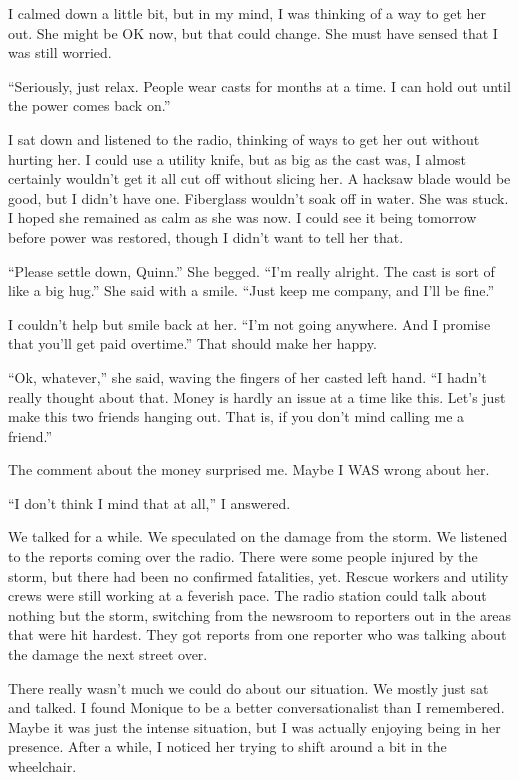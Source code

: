 I calmed down a little bit, but in my mind, I was thinking of a way to get her out. She
might be OK now, but that could change. She must have sensed that I was still worried.

``Seriously, just relax. People wear casts for months at a time. I can hold out until the
power comes back on.'' 

I sat down and listened to the radio, thinking of ways to get her out without hurting her.
I could use a utility knife, but as big as the cast was, I almost certainly wouldn't get it all
cut off without slicing her. A hacksaw blade would be good, but I didn't have one. Fiberglass
wouldn't soak off in water. She was stuck. I hoped she remained as calm as she was now. I could
see it being tomorrow before power was restored, though I didn't want to tell her that.

``Please settle down, Quinn.'' She begged. ``I'm really alright. The cast is sort of like a
big hug.'' She said with a smile. ``Just keep me company, and I'll be fine.''

I couldn't help but smile back at her. ``I'm not going anywhere. And I promise that you'll
get paid overtime.'' That should make her happy.

``Ok, whatever,'' she said, waving the fingers of her casted left hand. ``I hadn't really
thought about that. Money is hardly an issue at a time like this. Let's just make this two
friends hanging out. That is, if you don't mind calling me a friend.''

The comment about the money surprised me. Maybe I WAS wrong about her.

``I don't think I mind that at all,'' I answered.

We talked for a while. We speculated on the damage from the storm. We listened to the
reports coming over the radio. There were some people injured by the storm, but there had been
no confirmed fatalities, yet. Rescue workers and utility crews were still working at a feverish
pace. The radio station could talk about nothing but the storm, switching from the newsroom to
reporters out in the areas that were hit hardest. They got reports from one reporter who was
talking about the damage the next street over.

There really wasn't much we could do about our situation. We mostly just sat and talked. I
found Monique to be a better conversationalist than I remembered. Maybe it was just the intense
situation, but I was actually enjoying being in her presence. After a while, I noticed her
trying to shift around a bit in the wheelchair.

